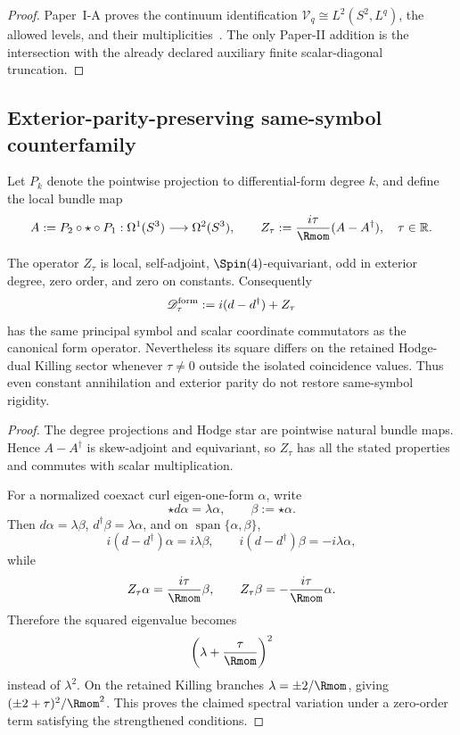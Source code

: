 \documentclass[11pt,a4paper]{article}
\begin{document}
\begin{proof}
Paper~I-A proves the continuum identification
\(\mathcal V_q\cong L^2(S^2,L^q)\), the allowed levels, and their
multiplicities~\cite{Kugelmann2026a}.  The only Paper-II addition is the
intersection with the already declared auxiliary finite scalar-diagonal truncation.
\end{proof}





\subsection{Exterior-parity-preserving same-symbol counterfamily}
\label{p2d:app:form-zero-order-counterfamily}

Let \(P_k\) denote the pointwise projection to differential-form degree
\(k\), and define the local bundle map
\[
 A:=P_2\circ\star\circ P_1:\Omega^1(S^3)\longrightarrow\Omega^2(S^3),
 \qquad
 Z_\tau:=\frac{i\tau}{\Rmom}(A-A^\dagger),
 \quad \tau\in\mathbb R.
\]

\begin{proposition}
\label{p2d:prop:form-zero-order-counterfamily}
The operator \(Z_\tau\) is local, self-adjoint,
\(\Spin(4)\)-equivariant, odd in exterior degree, zero order, and zero on
constants.  Consequently
\[
 \mathscr D_\tau^{\rm form}:=i(d-d^\dagger)+Z_\tau
\]
has the same principal symbol and scalar coordinate commutators as the
canonical form operator.  Nevertheless its square differs on the retained
Hodge-dual Killing sector whenever \(\tau\ne0\) outside the isolated
coincidence values.  Thus even constant annihilation and exterior parity do
not restore same-symbol rigidity.
\end{proposition}

\begin{proof}
The degree projections and Hodge star are pointwise natural bundle maps.
Hence \(A-A^\dagger\) is skew-adjoint and equivariant, so \(Z_\tau\) has all
the stated properties and commutes with scalar multiplication.

For a normalized coexact curl eigen-one-form \(\alpha\), write
\[
 \star d\alpha=\lambda\alpha,
 \qquad \beta:=\star\alpha.
\]
Then \(d\alpha=\lambda\beta\),
\(d^\dagger\beta=\lambda\alpha\), and on
\(\operatorname{span}\{\alpha,\beta\}\),
\[
 i(d-d^\dagger)\alpha=i\lambda\beta,
 \qquad
 i(d-d^\dagger)\beta=-i\lambda\alpha,
\]
while
\[
 Z_\tau\alpha=\frac{i\tau}{\Rmom}\beta,
 \qquad
 Z_\tau\beta=-\frac{i\tau}{\Rmom}\alpha.
\]
Therefore the squared eigenvalue becomes
\[
 \left(\lambda+\frac{\tau}{\Rmom}\right)^2
\]
instead of \(\lambda^2\).  On the retained Killing branches
\(\lambda=\pm2/\Rmom\), giving
\((\pm2+\tau)^2/\Rmom^2\).  This proves the claimed spectral variation under
a zero-order term satisfying the strengthened conditions.
\end{proof}
\end{document}
